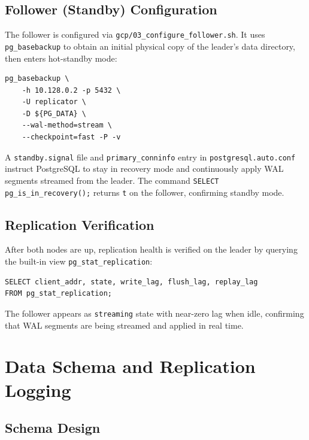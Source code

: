 \documentclass[12pt,a4paper]{article}
\begin{document}
\subsection{Follower (Standby) Configuration}

The follower is configured via \texttt{gcp/03\_configure\_follower.sh}. It
uses \texttt{pg\_basebackup} to obtain an initial physical copy of the leader's
data directory, then enters hot-standby mode:

\begin{lstlisting}[style=bashstyle, caption={Follower base backup command}]
pg_basebackup \
    -h 10.128.0.2 -p 5432 \
    -U replicator \
    -D ${PG_DATA} \
    --wal-method=stream \
    --checkpoint=fast -P -v
\end{lstlisting}

A \texttt{standby.signal} file and \texttt{primary\_conninfo} entry in
\texttt{postgresql.auto.conf} instruct PostgreSQL to stay in recovery mode and
continuously apply WAL segments streamed from the leader. The command
\texttt{SELECT pg\_is\_in\_recovery();} returns \texttt{t} on the follower,
confirming standby mode.

\subsection{Replication Verification}

After both nodes are up, replication health is verified on the leader
by querying the built-in view \texttt{pg\_stat\_\allowbreak replication}:

\begin{lstlisting}[style=sqlstyle, caption={Replication status query on leader}]
SELECT client_addr, state, write_lag, flush_lag, replay_lag
FROM pg_stat_replication;
\end{lstlisting}

The follower appears as \texttt{streaming} state with near-zero lag when idle,
confirming that WAL segments are being streamed and applied in real time.

\section{Data Schema and Replication Logging}

\subsection{Schema Design}
\end{document}
